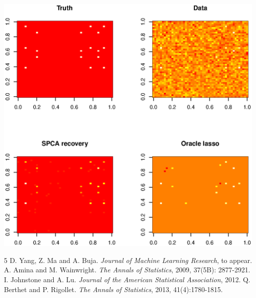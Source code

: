 \documentclass[landscape,a0b,final]{a0poster}
\newenvironment{poster}{
  \begin{center}
  \begin{minipage}[c]{0.98\textwidth}
}{
  \end{minipage}
  \end{center}
}
\newenvironment{pcolumn}[1]{
  \begin{minipage}{#1\textwidth}
  \begin{center}
}{
  \end{center}
  \end{minipage}
}
\begin{document}
\begin{poster}
\begin{center}
\begin{pcolumn}{0.30}
{\begin{minipage}[c][\linewidth][c]{\linewidth}
  \begin{center}
    \includegraphics[width=\linewidth,angle=0]{figures/image.eps}
  \end{center}
\end{minipage}
\vspace{-2cm}
\begin{thebibliography}{5}
 D. Yang, Z. Ma and A. Buja. \emph{Journal of Machine Learning Research},  to appear.
 A. Amina and M. Wainwright. \emph{The Annals of Statistics}, 2009, 37(5B): 2877-2921.
 I. Johnstone and A. Lu. \emph{Journal of the American Statistical Association}, 2012. 
 Q. Berthet and P. Rigollet. \emph{The Annals of Statistics}, 2013, 41(4):1780-1815.
\end{thebibliography}
}
\end{pcolumn}
\end{center}
\end{poster}
\end{document}
